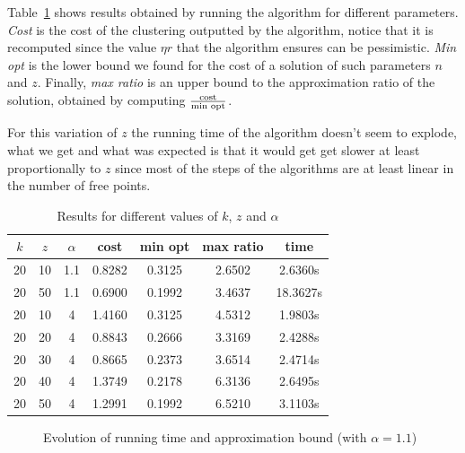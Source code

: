 \documentclass{article}
\begin{document}
    Table~\ref{tab:results} shows results obtained by running the algorithm for
    different parameters. \textit{Cost} is the cost of the clustering outputted
    by the algorithm, notice that it is recomputed since the value $\eta r$
    that the algorithm ensures can be pessimistic. \textit{Min opt} is the
    lower bound we found for the cost of a solution of such parameters $n$ and
    $z$. Finally, \textit{max ratio} is an upper bound to the approximation
    ratio of the solution, obtained by computing $\frac{\text{cost}}{\text{min\
    opt}}$.

    For this variation of $z$ the running time of the algorithm doesn't seem to
    explode, what we get and what was expected is that it would get get slower
    at least proportionally to $z$ since most of the steps of the algorithms
    are at least linear in the number of free points.

    \begin{table}[h]
      \centering
      \begin{tabular}{c|c|c|c|c|c|c}
        $k$ & $z$ & $\alpha$ & cost   & min opt & max ratio & time     \\\hline
        20  & 10  & 1.1      & 0.8282 & 0.3125  & 2.6502    & 2.6360s  \\
        20  & 50  & 1.1      & 0.6900 & 0.1992  & 3.4637    & 18.3627s \\
        20  & 10  & 4        & 1.4160 & 0.3125  & 4.5312    & 1.9803s  \\
        20  & 20  & 4        & 0.8843 & 0.2666  & 3.3169    & 2.4288s  \\
        20  & 30  & 4        & 0.8665 & 0.2373  & 3.6514    & 2.4714s  \\
        20  & 40  & 4        & 1.3749 & 0.2178  & 6.3136    & 2.6495s  \\
        20  & 50  & 4        & 1.2991 & 0.1992  & 6.5210    & 3.1103s
      \end{tabular}
      \caption{Results for different values of $k$, $z$ and $\alpha$}
      \label{tab:results}
    \end{table}

    \begin{figure}[h]
      \label{plot:results}
      \centering
      \begin{subfigure}[b]{0.45\textwidth}
        \resizebox{\textwidth}{!}{}
      \end{subfigure}
      \begin{subfigure}[b]{0.45\textwidth}
        \resizebox{\textwidth}{!}{}
      \end{subfigure}
      \caption{Evolution of running time and approximation bound (with $\alpha
        = 1.1$)}
    \end{figure}
\end{document}
